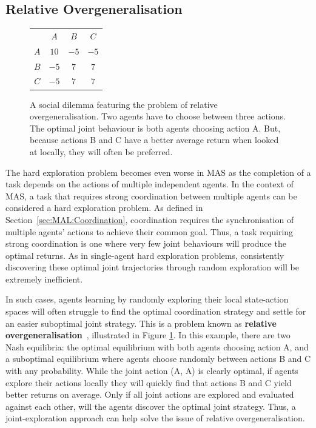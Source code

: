 \subsection{Relative Overgeneralisation}\label{sec:JIM:RelOvergen}

\begin{figure}[t]
    \centering
    \begin{tabular}{c|c|c|c|}
        \multicolumn{1}{c}{} & \multicolumn{1}{c}{$A$}  & \multicolumn{1}{c}{$B$}  & \multicolumn{1}{c}{$C$} \\\cline{2-4}
        $A$ & $10$ & $-5$ & $-5$ \\\cline{2-4}
        $B$ & $-5$ & $7$ & $7$ \\\cline{2-4}
        $C$ & $-5$ & $7$ & $7$ \\\cline{2-4}
    \end{tabular}
    \caption{A social dilemma featuring the problem of relative overgeneralisation. Two agents have to choose between three actions. The optimal joint behaviour is both agents choosing action A. But, because actions B and C have a better average return when looked at locally, they will often be preferred.}
    \label{fig:JIM:ro_matrix}
\end{figure}

The hard exploration problem becomes even worse in MAS as the completion of a task depends on the actions of multiple independent agents. In the context of MAS, a task that requires strong coordination between multiple agents can be considered a hard exploration problem. As defined in Section~\ref{sec:MAL:Coordination}, coordination requires the synchronisation of multiple agents' actions to achieve their common goal. Thus, a task requiring strong coordination is one where very few joint behaviours will produce the optimal returns. As in single-agent hard exploration problems, consistently discovering these optimal joint trajectories through random exploration will be extremely inefficient. 

In such cases, agents learning by randomly exploring their local state-action spaces will often struggle to find the optimal coordination strategy and settle for an easier suboptimal joint strategy. This is a problem known as \textbf{relative overgeneralisation}~\citep{Wiegand2003_RelOvergen, Wei2016_RelOvergen}, illustrated in Figure \ref{fig:JIM:ro_matrix}. In this example, there are two Nash equilibria: the optimal equilibrium with both agents choosing action A, and a suboptimal equilibrium where agents choose randomly between actions B and C with any probability. While the joint action (A, A) is clearly optimal, if agents explore their actions locally they will quickly find that actions B and C yield better returns on average. Only if all joint actions are explored and evaluated against each other, will the agents discover the optimal joint strategy. Thus, a joint-exploration approach can help solve the issue of relative overgeneralisation.







